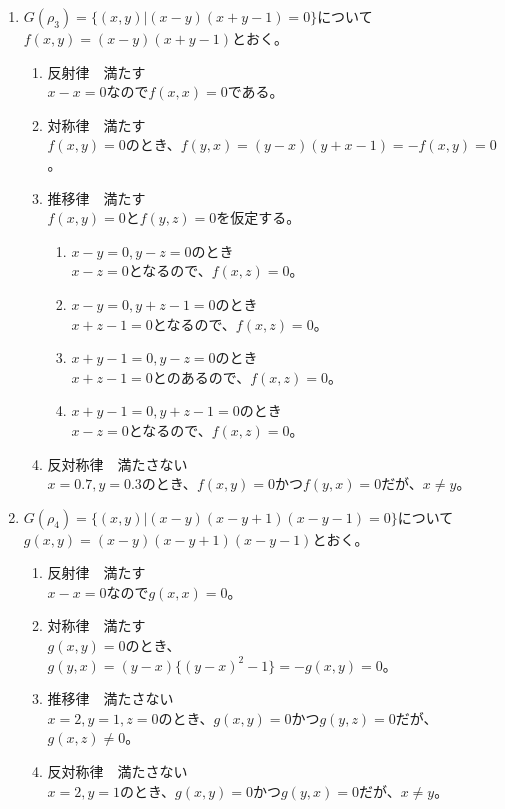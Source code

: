 \documentclass{jsarticle}
\begin{document}
\begin{enumerate}
\item $G(\rho_3)=\{(x,y)|(x-y)(x+y-1)=0\}$について\\
$f(x,y)=(x-y)(x+y-1)$とおく。
\begin{enumerate}
\item 反射律　満たす\\
$x-x=0$なので$f(x,x)=0$である。
\item 対称律　満たす\\
$f(x,y)=0$のとき、$f(y,x)=(y-x)(y+x-1)=-f(x,y)=0$。
\item 推移律　満たす\\
$f(x,y)=0$と$f(y,z)=0$を仮定する。
\begin{enumerate}
\item $x-y=0,y-z=0$のとき\\
$x-z=0$となるので、$f(x,z)=0$。
\item $x-y=0, y+z-1=0$のとき\\
$x+z-1=0$となるので、$f(x,z)=0$。
\item $x+y-1=0, y-z=0$のとき\\
$x+z-1=0$とのあるので、$f(x,z)=0$。
\item $x+y-1=0, y+z-1=0$のとき\\
$x-z=0$となるので、$f(x,z)=0$。
\end{enumerate}
\item 反対称律　満たさない\\
$x=0.7,y=0.3$のとき、$f(x,y)=0$かつ$f(y,x)=0$だが、$x\neq y$。
\end{enumerate}

\item $G(\rho_4)=\{(x,y)|(x-y)(x-y+1)(x-y-1)=0\}$について\\
$g(x,y)=(x-y)(x-y+1)(x-y-1)$とおく。
\begin{enumerate}
\item 反射律　満たす\\
$x-x=0$なので$g(x,x)=0$。
\item 対称律　満たす\\
$g(x,y)=0$のとき、$g(y,x)=(y-x)\{(y-x)^2-1\}=-g(x,y)=0$。
\item 推移律　満たさない\\
$x=2,y=1,z=0$のとき、$g(x,y)=0$かつ$g(y,z)=0$だが、$g(x,z)\neq 0$。
\item 反対称律　満たさない\\
$x=2,y=1$のとき、$g(x,y)=0$かつ$g(y,x)=0$だが、$x\neq y$。
\end{enumerate}
\end{enumerate}
\end{document}
